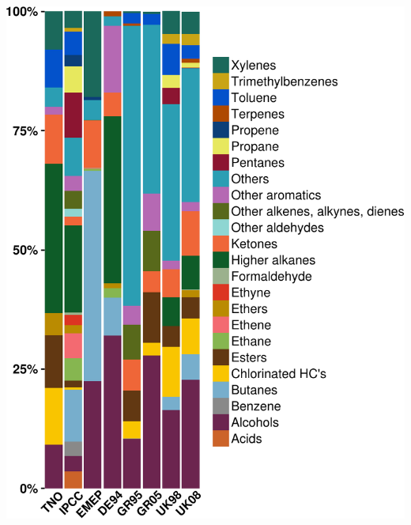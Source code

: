 \begin{frame}
\begin{columns}[onlytextwidth]
\begin{column}{0.45\textwidth}
\begin{flushright}
                \includegraphics[width=1.10\textwidth]{../Pictures/Speciations_for_MCM} 
            \end{flushright}
        \end{column}
    \end{columns}
\end{frame}

